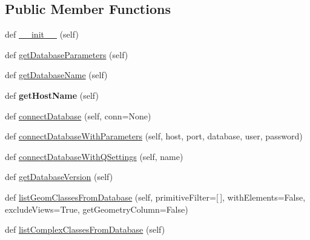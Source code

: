 \subsection*{Public Member Functions}
\begin{DoxyCompactItemize}
\item 
def \mbox{\hyperlink{class_dsg_tools_1_1_factories_1_1_db_factory_1_1postgis_db_1_1_postgis_db_a885c7a543d80f90a3d8c934980441902}{\+\_\+\+\_\+init\+\_\+\+\_\+}} (self)
\item 
def \mbox{\hyperlink{class_dsg_tools_1_1_factories_1_1_db_factory_1_1postgis_db_1_1_postgis_db_af2a9b407a9db482bae0098372a2a897f}{get\+Database\+Parameters}} (self)
\item 
def \mbox{\hyperlink{class_dsg_tools_1_1_factories_1_1_db_factory_1_1postgis_db_1_1_postgis_db_ad5c022a496123d2de6ab43faf16819f0}{get\+Database\+Name}} (self)
\item 
\mbox{\label{class_dsg_tools_1_1_factories_1_1_db_factory_1_1postgis_db_1_1_postgis_db_a9012614d0f8c4cf279cb1d1eedcc7db4}} 
def {\bfseries get\+Host\+Name} (self)
\item 
def \mbox{\hyperlink{class_dsg_tools_1_1_factories_1_1_db_factory_1_1postgis_db_1_1_postgis_db_aefc6ec43dd4d6e8f63d43e3f36f7cba2}{connect\+Database}} (self, conn=None)
\item 
def \mbox{\hyperlink{class_dsg_tools_1_1_factories_1_1_db_factory_1_1postgis_db_1_1_postgis_db_a552929486e4a1e3d3fc9b87dffc8e0b9}{connect\+Database\+With\+Parameters}} (self, host, port, database, user, password)
\item 
def \mbox{\hyperlink{class_dsg_tools_1_1_factories_1_1_db_factory_1_1postgis_db_1_1_postgis_db_a122957ae0b6aae812ae0b7be9372cb52}{connect\+Database\+With\+Q\+Settings}} (self, name)
\item 
def \mbox{\hyperlink{class_dsg_tools_1_1_factories_1_1_db_factory_1_1postgis_db_1_1_postgis_db_af7605f4bd100927ce43472e864764774}{get\+Database\+Version}} (self)
\item 
def \mbox{\hyperlink{class_dsg_tools_1_1_factories_1_1_db_factory_1_1postgis_db_1_1_postgis_db_ac8bbdfcec0f449e4f45fff3392a8446b}{list\+Geom\+Classes\+From\+Database}} (self, primitive\+Filter=\mbox{[}$\,$\mbox{]}, with\+Elements=False, exclude\+Views=True, get\+Geometry\+Column=False)
\item 
def \mbox{\hyperlink{class_dsg_tools_1_1_factories_1_1_db_factory_1_1postgis_db_1_1_postgis_db_a3183409cb4384c67bfe6a41b2c9e0037}{list\+Complex\+Classes\+From\+Database}} (self)

\end{DoxyCompactItemize}
